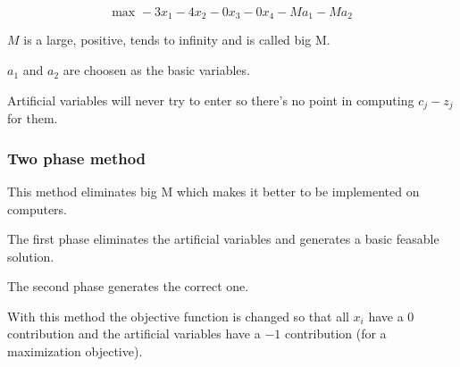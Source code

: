 \documentclass[12pt]{article}
\begin{document}
\begin{equation*}
    \text{max } -3x_1 - 4x_2 - 0x_3 - 0x_4 - Ma_1 - Ma_2
\end{equation*}

$M$ is a large, positive, tends to infinity and is called big M.

$a_1$ and $a_2$ are choosen as the basic variables.

Artificial variables will never try to enter so there's no point in computing
$c_j-z_j$ for them.

\subsubsection{Two phase method}

This method eliminates big M which makes it better to be implemented on
computers.

The first phase eliminates the artificial variables and generates a basic
feasable solution.

The second phase generates the correct one.

With this method the objective function is changed so that all $x_i$ have a 0
contribution and the artificial variables have a $-1$ contribution (for a
maximization objective).
\end{document}

